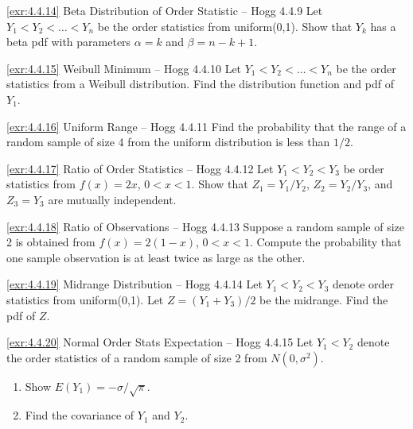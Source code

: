 \begin{exercise}{\ref{exr:4.4.14} Beta Distribution of Order Statistic – Hogg 4.4.9}\label{exr:4.4.14}
Let $Y_1 < Y_2 < \ldots < Y_n$ be the order statistics from uniform(0,1). Show that $Y_k$ has a beta pdf with parameters $\alpha=k$ and $\beta=n-k+1$.
\end{exercise}

\begin{exercise}{\ref{exr:4.4.15} Weibull Minimum – Hogg 4.4.10}\label{exr:4.4.15}
Let $Y_1 < Y_2 < \ldots < Y_n$ be the order statistics from a Weibull distribution. Find the distribution function and pdf of $Y_1$.
\end{exercise}

\begin{exercise}{\ref{exr:4.4.16} Uniform Range – Hogg 4.4.11}\label{exr:4.4.16}
Find the probability that the range of a random sample of size 4 from the uniform distribution is less than $1/2$.
\end{exercise}

\begin{exercise}{\ref{exr:4.4.17} Ratio of Order Statistics – Hogg 4.4.12}\label{exr:4.4.17}
Let $Y_1 < Y_2 < Y_3$ be order statistics from $f(x)=2x$, $0<x<1$. Show that $Z_1=Y_1/Y_2$, $Z_2=Y_2/Y_3$, and $Z_3=Y_3$ are mutually independent.
\end{exercise}

\begin{exercise}{\ref{exr:4.4.18} Ratio of Observations – Hogg 4.4.13}\label{exr:4.4.18}
Suppose a random sample of size 2 is obtained from $f(x)=2(1-x)$, $0<x<1$. Compute the probability that one sample observation is at least twice as large as the other.
\end{exercise}

\begin{exercise}{\ref{exr:4.4.19} Midrange Distribution – Hogg 4.4.14}\label{exr:4.4.19}
Let $Y_1 < Y_2 < Y_3$ denote order statistics from uniform(0,1). Let $Z=(Y_1+Y_3)/2$ be the midrange. Find the pdf of $Z$.
\end{exercise}

\begin{exercise}{\ref{exr:4.4.20} Normal Order Stats Expectation – Hogg 4.4.15}\label{exr:4.4.20}
Let $Y_1 < Y_2$ denote the order statistics of a random sample of size 2 from $N(0,\sigma^2)$.
\begin{enumerate}
\item[(a)] Show $E(Y_1) = -\sigma/\sqrt{\pi}$.
\item[(b)] Find the covariance of $Y_1$ and $Y_2$.
\end{enumerate}
\end{exercise}


